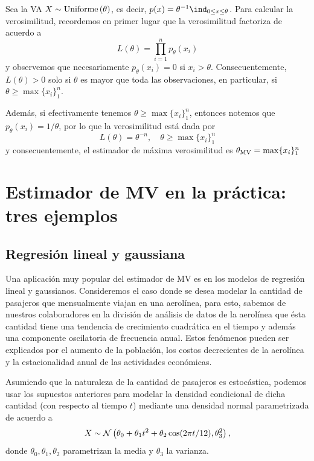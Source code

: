 \begin{example}
	Sea la VA $X\sim\text{Uniforme}\left(\theta\right)$, es decir, $p(x) = \theta^{-1} \ind_{0\leq x \leq \theta}$. Para calcular la verosimilitud, recordemos en primer lugar que la verosimilitud factoriza de acuerdo a  
	\begin{equation}
		L(\theta) = \prod_{i=1}^n p_\theta(x_i)
	\end{equation}
	y observemos que necesariamente $p_\theta(x_i) = 0$ si $x_i>\theta$. Consecuentemente, $L(\theta)>0$ solo si $\theta$ es mayor que toda las observaciones, en particular, si $\theta\geq\max\{x_i\}_1^n$.

	Además, si efectivamente tenemos $\theta\geq\max\{x_i\}_1^n$, entonces notemos que $p_\theta(x_i) = 1/\theta$, por lo que la verosimilitud está dada por
		\begin{equation}
		L(\theta) = \theta^{-n}, \quad \theta\geq\max\{x_i\}_1^n
	\end{equation}
	y consecuentemente, el estimador de máxima verosimilitud es ${\theta_\text{MV}} = \max\{x_i\}_1^n$
\end{example}

\section{Estimador de MV en la práctica: tres ejemplos} %
\label{sub:MV_tres_ejemplos}

\subsection{Regresión lineal y gaussiana} 
\label{sub:reg_lin}


Una aplicación muy popular del estimador de MV es en los modelos de regresión lineal y gaussianos. Consideremos el caso donde se desea modelar la cantidad de pasajeros que mensualmente viajan en una aerolínea, para esto, sabemos de nuestros colaboradores en la división de análisis de datos de la aerolínea que ésta cantidad tiene una tendencia de crecimiento cuadrática en el tiempo y además una componente oscilatoria de frecuencia anual. Estos fenómenos pueden ser explicados por el aumento de la población, los costos decrecientes de la aerolínea y la estacionalidad anual de las actividades económicas. 

Asumiendo que la naturaleza de la cantidad de pasajeros es estocástica, podemos usar los supuestos anteriores para modelar la densidad condicional  de dicha cantidad (con respecto al tiempo $t$) mediante una densidad normal parametrizada de acuerdo a 
\begin{equation}
	X \sim {\mathcal N}\left(\theta_0 + \theta_1 t^2 + \theta_2\cos(2\pi t/12), \theta_3^2\right),
\end{equation}
donde $\theta_0,\theta_1,\theta_2$ parametrizan la media y $\theta_3$ la varianza. 


